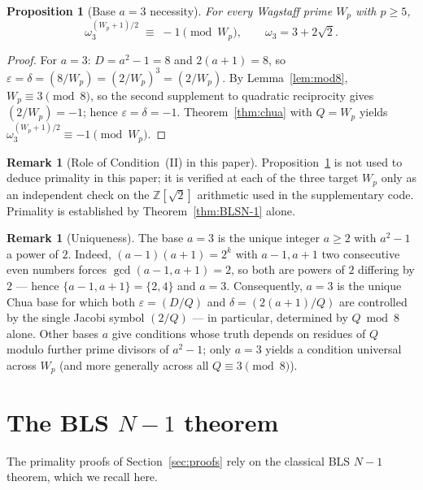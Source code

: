 \documentclass[11pt,a4paper]{amsart}
\theoremstyle{plain}
\newtheorem{proposition}[theorem]{Proposition}
\theoremstyle{definition}
\newtheorem{remark}[theorem]{Remark}
\newcommand{\Z}{\mathbb{Z}}
\newcommand{\wom}{\omega_3}
\newcommand{\sqrttwo}{\sqrt{2}}
\begin{document}
\begin{proposition}[Base $a=3$ necessity]
\label{prop:cond2}
For every Wagstaff prime $W_p$ with $p \geq 5$,
\[
  \wom^{(W_p + 1)/2} \;\equiv\; -1 \pmod{W_p}, \qquad \wom = 3 + 2\sqrttwo.
\]
\end{proposition}

\begin{proof}
For $a = 3$: $D = a^2 - 1 = 8$ and $2(a + 1) = 8$, so $\varepsilon =
\delta = (8/W_p) = (2/W_p)^3 = (2/W_p)$. By
Lemma~\ref{lem:mod8}, $W_p \equiv 3 \pmod 8$, so the second
supplement to quadratic reciprocity gives $(2/W_p) = -1$; hence
$\varepsilon = \delta = -1$. Theorem~\ref{thm:chua} with $Q = W_p$
yields $\wom^{(W_p + 1)/2} \equiv -1 \pmod{W_p}$.
\end{proof}

\begin{remark}[Role of Condition~(II) in this paper]
\label{rem:cond2-auxiliary}
Proposition~\ref{prop:cond2} is not used to deduce primality in this
paper; it is verified at each of the three target $W_p$ only as an
independent check on the $\Z[\sqrttwo]$ arithmetic used in the
supplementary code. Primality is established by
Theorem~\ref{thm:BLSN-1} alone.
\end{remark}

\begin{remark}[Uniqueness]
\label{rem:uniqueness}
The base $a = 3$ is the unique integer $a \geq 2$ with $a^2 - 1$ a
power of $2$. Indeed, $(a-1)(a+1) = 2^k$ with $a - 1, a + 1$ two
consecutive even numbers forces $\gcd(a-1, a+1) = 2$, so both are
powers of $2$ differing by $2$ --- hence $\{a-1, a+1\} = \{2, 4\}$
and $a = 3$. Consequently, $a = 3$ is the unique Chua base for which
both $\varepsilon = (D/Q)$ and $\delta = (2(a+1)/Q)$ are controlled by
the single Jacobi symbol $(2/Q)$ --- in particular, determined by
$Q \bmod 8$ alone. Other bases $a$ give conditions whose truth depends
on residues of $Q$ modulo further prime divisors of $a^2 - 1$; only
$a = 3$ yields a condition universal across $W_p$ (and more generally
across all $Q \equiv 3 \pmod 8$).
\end{remark}

\section{The BLS $N - 1$ theorem}
\label{sec:criteria}

The primality proofs of Section~\ref{sec:proofs} rely on the classical
BLS $N - 1$ theorem, which we recall here.
\end{document}
